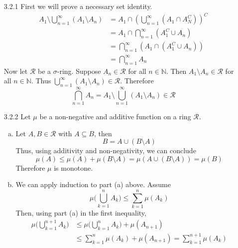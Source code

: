 \documentclass[../../Solutions.tex]{subfiles}
\begin{document}
\begin{itemize}
	\item [3.2.1] First we will prove a necessary set identity.
		\begin{equation*} \begin{split}
			A_1 \setminus \bigcup_{n=1}^\infty (A_1 \setminus A_n) & = A_1 \cap \left( \bigcup_{n=1}^\infty (A_1 \cap A_N^C) \right)^C \\
				& = A_1 \cap \bigcap_{n=1}^\infty (A_1^C \cup A_n) \\
				& = \bigcap_{n=1}^\infty (A_1 \cap (A_1^C \cup A_n)) \\
				& = \bigcap_{n=1}^\infty A_n
		\end{split} \end{equation*}
		Now let $\mathcal{R}$ be a $\sigma$-ring.
		Suppose $A_n \in \mathcal{R}$ for all $n \in \mathbb{N}$.
		Then $A_1 \setminus A_n \in \mathcal{R}$ for all $n \in \mathbb{N}$.
		Thus $\bigcup_{n=1}^\infty (A_1 \setminus A_n) \in \mathcal{R}$.
		Therefore
		$$ \bigcap_{n=1}^\infty A_n = A_1 \setminus \bigcup_{n=1}^\infty (A_1 \setminus A_n) \in \mathcal{R} $$
	
	\item [3.2.2] Let $\mu$ be a non-negative and additive function on a ring $\mathcal{R}$.
	\begin{enumerate}[(a)]
		\item Let $A,B \in \mathcal{R}$ with $A \subseteq B$, then
			$$ B = A \cup (B\setminus A) $$
			Thus, using additivity and non-negativity, we can conclude
			$$ \mu(A) \leq \mu(A)+\mu(B\setminus A) = \mu(A\cup(B\setminus A)) = \mu(B) $$
			Therefore $\mu$ is monotone.
		\item We can apply induction to part (a) above.
			Assume
			$$ \mu\Big(\bigcup_{k=1}^n A_k \Big) \leq \sum_{k=1}^n \mu(A_k) $$
			Then, using part (a) in the first inequality,
			\begin{equation*} \begin{split}
				\mu\Big(\bigcup_{k=1}^{n+1} A_k \Big) & \leq \mu\Big(\bigcup_{k=1}^{n} A_k \Big) + \mu(A_{n+1}) \\
					& \leq \sum_{k=1}^{n} \mu(A_k) + \mu(A_{n+1}) = \sum_{k=1}^{n+1} \mu(A_k)
			\end{split} \end{equation*}
	\end{enumerate}
	

\end{itemize}
\end{document}
